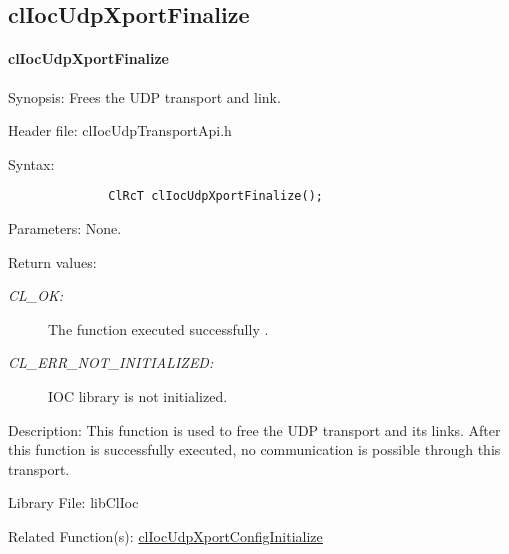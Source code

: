 \begin{flushleft}
\subsection{clIocUdpXportFinalize}
\hypertarget{pageioc402}{}\paragraph{cl\-Ioc\-Udp\-Xport\-Finalize}\label{pageioc402}
\begin{Desc}
\item[Synopsis:]Frees the UDP transport and link.\end{Desc}
\begin{Desc}
\item[Header file:]clIocUdpTransportApi.h\end{Desc}
\begin{Desc}
\item[Syntax:]

\footnotesize\begin{verbatim}              ClRcT clIocUdpXportFinalize();
\end{verbatim}
\normalsize
\end{Desc}
\begin{Desc}
\item[Parameters:]None.\end{Desc}
\begin{Desc}
\item[Return values:]
\begin{description}
\item[{\em CL\_\-OK:}]The function executed successfully . \item[{\em CL\_\-ERR\_\-NOT\_\-INITIALIZED:}]IOC library is not initialized.\end{description}
\end{Desc}
\begin{Desc}
\item[Description: ]This function is used to free the UDP transport and its links. After this function is successfully executed, no communication is 
possible through this transport.\end{Desc}
\begin{Desc}
\item[Library File:]libClIoc\end{Desc}
\begin{Desc}
\item[Related Function(s):]\hyperlink{pageioc401}{cl\-Ioc\-Udp\-Xport\-Config\-Initialize} \end{Desc}


\end{flushleft}

